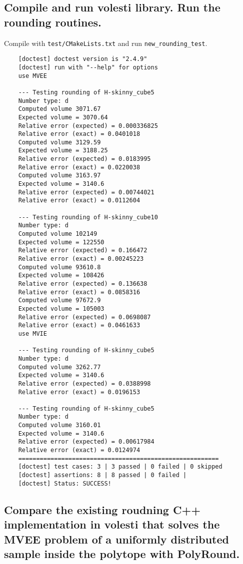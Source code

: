 \documentclass[11pt]{article}
\begin{document}
\subsection{Compile and run volesti library. Run the rounding routines.}

Compile with \texttt{test/CMakeLists.txt} and run \texttt{new\_rounding\_test}.

\begin{lstlisting}
    [doctest] doctest version is "2.4.9"
    [doctest] run with "--help" for options
    use MVEE
    
    --- Testing rounding of H-skinny_cube5
    Number type: d
    Computed volume 3071.67
    Expected volume = 3070.64
    Relative error (expected) = 0.000336825
    Relative error (exact) = 0.0401018
    Computed volume 3129.59
    Expected volume = 3188.25
    Relative error (expected) = 0.0183995
    Relative error (exact) = 0.0220038
    Computed volume 3163.97
    Expected volume = 3140.6
    Relative error (expected) = 0.00744021
    Relative error (exact) = 0.0112604
    
    --- Testing rounding of H-skinny_cube10
    Number type: d
    Computed volume 102149
    Expected volume = 122550
    Relative error (expected) = 0.166472
    Relative error (exact) = 0.00245223
    Computed volume 93610.8
    Expected volume = 108426
    Relative error (expected) = 0.136638
    Relative error (exact) = 0.0858316
    Computed volume 97672.9
    Expected volume = 105003
    Relative error (expected) = 0.0698087
    Relative error (exact) = 0.0461633
    use MVIE
    
    --- Testing rounding of H-skinny_cube5
    Number type: d
    Computed volume 3262.77
    Expected volume = 3140.6
    Relative error (expected) = 0.0388998
    Relative error (exact) = 0.0196153
    
    --- Testing rounding of H-skinny_cube5
    Number type: d
    Computed volume 3160.01
    Expected volume = 3140.6
    Relative error (expected) = 0.00617984
    Relative error (exact) = 0.0124974
    ========================================================
    [doctest] test cases: 3 | 3 passed | 0 failed | 0 skipped
    [doctest] assertions: 8 | 8 passed | 0 failed |
    [doctest] Status: SUCCESS!
\end{lstlisting}

\subsection{Compare the existing roudning C++ implementation in volesti that solves the MVEE problem of a uniformly distributed sample inside the polytope with PolyRound.}
\end{document}
